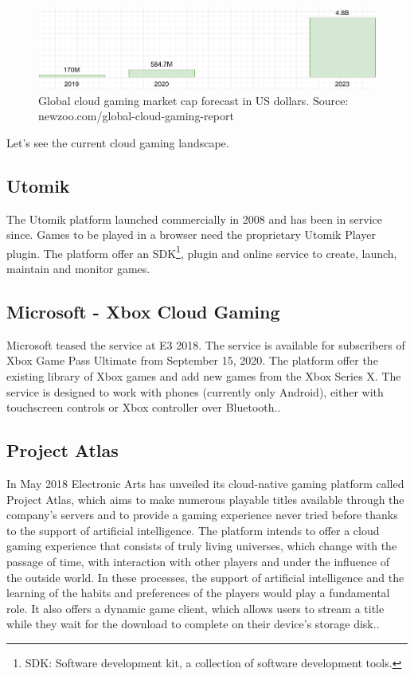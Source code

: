 \begin{figure}[H]
	\includegraphics[width=\linewidth]{immagini/Newzoo_Cloud_Gaming_Revenues}
	\caption{Global cloud gaming market cap forecast in US dollars. Source: newzoo.com/global-cloud-gaming-report}
	\label{fig:Newzoo_Cloud_Gaming_Revenues_Sept_2020}
\end{figure}

Let's see the current cloud gaming landscape.

\subsection{Utomik}
The Utomik platform launched commercially in 2008 and has been in service since. Games to be played in a browser need the proprietary Utomik Player plugin. The platform offer an SDK\footnote{SDK: Software development kit, a collection of software development tools.}, plugin and online service to create, launch, maintain and monitor games\cite{Utomik}.

\subsection{Microsoft - Xbox Cloud Gaming}
Microsoft teased the service at E3 2018. The service is available for subscribers of Xbox Game Pass Ultimate from September 15, 2020. The platform offer the existing library of Xbox games and add new games from the Xbox Series X. The service is designed to work with phones (currently only Android), either with touchscreen controls or Xbox controller over Bluetooth.\cite{Xbox_Game_Pass_cloud_gaming}.

\subsection{Project Atlas}
In May 2018 Electronic Arts has unveiled its cloud-native gaming platform called Project Atlas, which aims to make numerous playable titles available through the company's servers and to provide a gaming experience never tried before thanks to the support of artificial intelligence. The platform intends to offer a cloud gaming experience that consists of truly living universes, which change with the passage of time, with interaction with other players and under the influence of the outside world. In these processes, the support of artificial intelligence and the learning of the habits and preferences of the players would play a fundamental role. It also offers a dynamic game client, which allows users to stream a title while they wait for the download to complete on their device's storage disk.\cite{Project_Atlas}.

